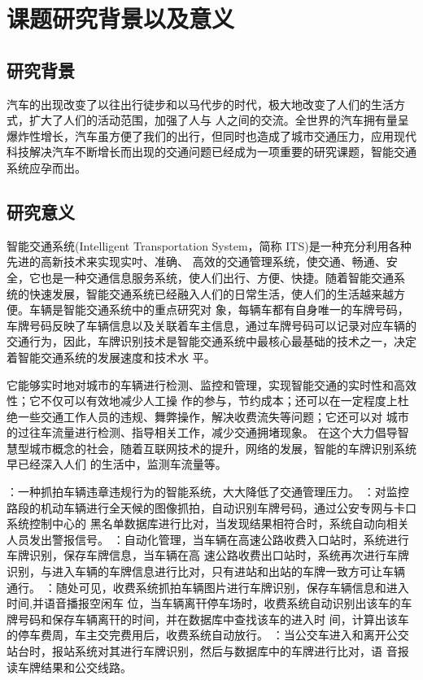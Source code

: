 \chapter{课题研究背景以及意义}
\section{研究背景}
汽车的出现改变了以往出行徒步和以马代步的时代，极大地改变了人们的生活方式，扩大了人们的活动范围，加强了人与
人之间的交流。全世界的汽车拥有量呈爆炸性增长，汽车虽方便了我们的出行，但同时也造成了城市交通压力，应用现代
科技解决汽车不断增长而出现的交通问题已经成为一项重要的研究课题，智能交通系统应孕而出。
\section{研究意义}
\par
智能交通系统(Intelligent Transportation System，简称 ITS)是一种充分利用各种先进的高新技术来实现实吋、准确、
高效的交通管理系统，使交通、畅通、安全，它也是一种交通信息服务系统，使人们出行、方便、快捷。随着智能交通系
统的快速发展，智能交通系统已经融入人们的日常生活，使人们的生活越来越方便。车辆是智能交通系统中的重点研究对
象，每辆车都有自身唯一的车牌号码，车牌号码反映了车辆信息以及关联着车主信息，通过车牌号码可以记录对应车辆的
交通行为，因此，车牌识别技术是智能交通系统中最核心最基础的技术之一，决定着智能交通系统的发展速度和技术水
平。
\par
它能够实时地对城市的车辆进行检测、监控和管理，实现智能交通的实时性和高效性；它不仅可以有效地减少人工操
作的参与，节约成本；还可以在一定程度上杜绝一些交通工作人员的违规、舞弊操作，解决收费流失等问题；它还可以对
城市的过往车流量进行检测、指导相关工作，减少交通拥堵现象。
在这个大力倡导智慧型城市概念的社会，随着互联网技术的提升，网络的发展，智能的车牌识别系统早已经深入人们
的生活中，监测车流量等。
\begin{itemize}
：一种抓拍车辆违章违规行为的智能系统，大大降低了交通管理压力。
：对监控路段的机动车辆进行全天候的图像抓拍，自动识别车牌号码，通过公安专网与卡口系统控制中心的
黑名单数据库进行比对，当发现结果相符合时，系统自动向相关人员发出警报信号。
：自动化管理，当车辆在高速公路收费入口站时，系统进行车牌识别，保存车牌信息，当车辆在高
速公路收费出口站时，系统再次进行车牌识别，与进入车辆的车牌信息进行比对，只有进站和出站的车牌一致方可让车辆
通行。
：随处可见，收费系统抓拍车辆图片进行车牌识别，保存车辆信息和进入时间,并语音播报空闲车
位，当车辆离幵停车场时，收费系统自动识别出该车的车牌号码和保存车辆离幵的时间，并在数据库中查找该车的进入时
间，计算出该车的停车费周，车主交完费用后，收费系统自动放行。
：当公交车进入和离开公交站台时，报站系统对其进行车牌识别，然后与数据库中的车牌进行比对，语
音报读车牌结果和公交线路。
\end{itemize}

